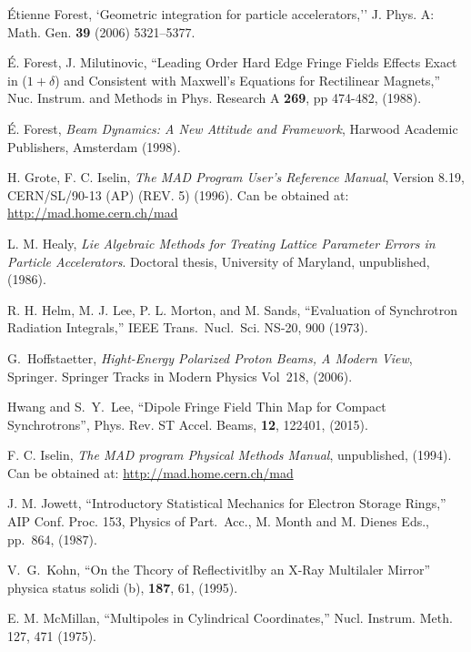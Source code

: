 \begin{thebibliography}{XXXXXXX99}
\'Etienne Forest, `Geometric integration for particle accelerators,''
J. Phys. A: Math. Gen. {\bf 39} (2006) 5321–5377.

\'E. Forest, J. Milutinovic, 
``Leading Order Hard Edge Fringe Fields Effects Exact in ($1+\delta$) and 
Consistent with Maxwell's Equations for Rectilinear Magnets,''
Nuc. Instrum. and Methods in Phys. Research A {\bf 269}, pp 474-482, (1988).

\'E. Forest, {\em Beam Dynamics: A New Attitude and Framework},
Harwood Academic Publishers, Amsterdam (1998).


H. Grote, F. C. Iselin, {\it The MAD Program User's Reference Manual},
Version 8.19, CERN/SL/90-13 (AP) (REV. 5) (1996). 
Can be obtained at:
\hfill\break
\hspace*{0.3in}
\url{http://mad.home.cern.ch/mad} 

L. M. Healy, {\it Lie Algebraic Methods for Treating Lattice Parameter
Errors in Particle Accelerators}. Doctoral thesis, University of
Maryland, unpublished, (1986).

R. H. Helm, M. J. Lee, P. L. Morton, and M. Sands, 
``Evaluation of Synchrotron Radiation Integrals,''
IEEE Trans.~Nucl.~Sci. NS-20, 900 (1973).

G.~Hoffstaetter, 
{\it Hight-Energy Polarized Proton Beams, A Modern View}, 
Springer. Springer Tracks in Modern Physics Vol~218, (2006).

Hwang and S.~Y.~Lee, 
``Dipole Fringe Field Thin Map for Compact Synchrotrons'',
Phys. Rev. ST Accel. Beams, {\bf 12}, 122401, (2015).

F. C. Iselin, {\it The MAD program Physical Methods Manual}, 
unpublished, (1994).  Can be obtained at: 
\hfill\break
\hspace*{0.3in}
\url{http://mad.home.cern.ch/mad}

J. M. Jowett, ``Introductory Statistical Mechanics
for Electron Storage Rings,'' AIP Conf. Proc. 153, Physics of Part.\ Acc.,
M. Month and M. Dienes Eds., pp.~864, (1987).

V.~G.~Kohn, 
``On the Thcory of Reflectivitlby an X-Ray Multilaler Mirror''
physica status solidi (b), {\bf 187}, 61, (1995).

E. M. McMillan, 
``Multipoles in Cylindrical Coordinates,''
Nucl. Instrum. Meth. 127, 471 (1975).


\end{thebibliography}
